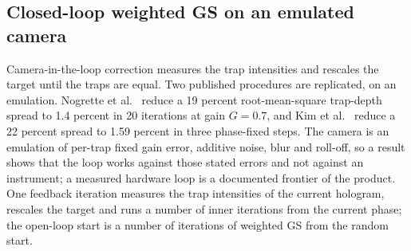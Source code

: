 \subsection{Closed-loop weighted GS on an emulated camera}\label{sec:m12}

Camera-in-the-loop correction measures the trap intensities and rescales the target until the traps are equal. Two published procedures are replicated, on an emulation. Nogrette et al.~\cite{nogrette} reduce a 19 percent root-mean-square trap-depth spread to 1.4 percent in 20 iterations at gain $G=0.7$, and Kim et al.~\cite{kim2019} reduce a 22 percent spread to 1.59 percent in three phase-fixed steps. The camera is an emulation of per-trap fixed gain error, additive noise, blur and roll-off, so a result shows that the loop works against those stated errors and not against an instrument; a measured hardware loop is a documented frontier of the product. One feedback iteration measures the trap intensities of the current hologram, rescales the target and runs a number of inner iterations from the current phase; the open-loop start is a number of iterations of weighted GS from the random start.

